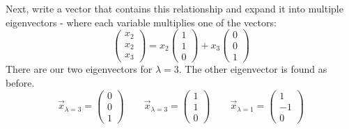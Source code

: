 \documentclass[12pts]{exam}
\begin{document}
\begin{questions}
\begin{solution}
\begin{parts}
Next, write a vector that contains this relationship and expand it into multiple eigenvectors - where each variable multiplies one of the vectors:
\[\begin{pmatrix}
x_2 \\ x_2 \\ x_3
\end{pmatrix} = 
x_2 \begin{pmatrix}
1 \\ 1 \\ 0
\end{pmatrix} + 
x_3 \begin{pmatrix}
0 \\ 0 \\ 1
\end{pmatrix}\]
There are our two eigenvectors for $\lambda = 3$. The other eigenvector is found as before.
%
\begin{equation}
\boxed{\vec{x}_{\lambda =3} = \begin{pmatrix} 0 \\ 0 \\ 1 \end{pmatrix} \qquad
\vec{x}_{\lambda =3} = \begin{pmatrix} 1 \\ 1 \\ 0 \end{pmatrix}\qquad
\vec{x}_{\lambda =1} = \begin{pmatrix} 1 \\ -1 \\ 0 \end{pmatrix}} \nonumber
\end{equation}


\end{parts}
\end{solution}
\end{questions}
\end{document}
